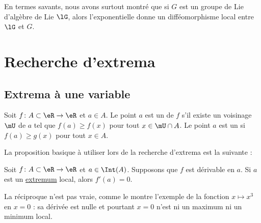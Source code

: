 \begin{remark}
    En termes savants, nous avons surtout montré que si \( G\) est un groupe de Lie d'algèbre de Lie \( \lG\), alors l'exponentielle donne un difféomorphisme local entre \( \lG\) et \( G\).
\end{remark}

\section{Recherche d'extrema}

\subsection{Extrema à une variable}

\begin{definition}
Soit $f\colon A\subset \eR\to \eR$ et $a\in A$. Le point $a$ est un  de $f$ s'il existe un voisinage $\mU$ de $a$ tel que $f(a)\geq f(x)$ pour tout $x\in\mU\cap A$. Le point $a$ est un  si $f(a)\geq g(x)$ pour tout $x\in A$.
\end{definition}

La proposition basique à utiliser lors de la recherche d'extrema est la suivante :
\begin{proposition}     \label{PROPooNVKXooXtKkuz}
Soit $f\colon A\subset\eR\to \eR$ et $a\in\Int(A)$. Supposons que $f$ est dérivable en $a$. Si $a$ est un \href{http://fr.wikipedia.org/wiki/Extremum}{extremum} local, alors $f'(a)=0$.
\end{proposition}

La réciproque n'est pas vraie, comme le montre l'exemple de la fonction $x\mapsto x^3$ en $x=0$ : sa dérivée est nulle et pourtant $x=0$ n'est ni un maximum ni un minimum local.

